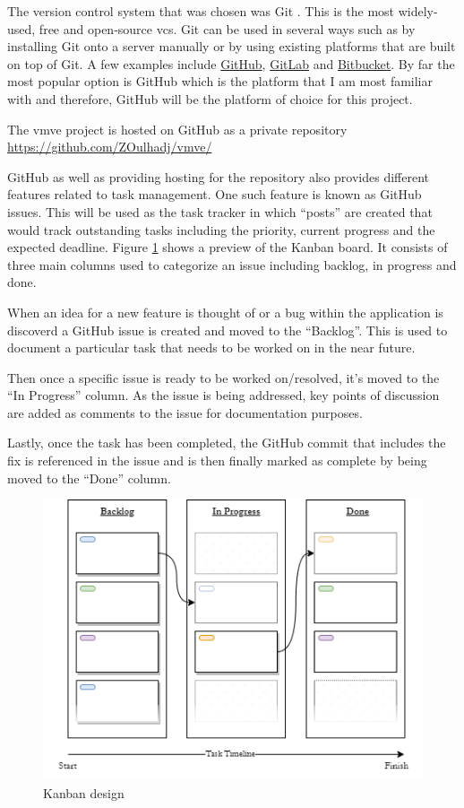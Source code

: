 \documentclass[11pt]{article}
\begin{document}
The version control system that was chosen was Git \cite{gitvcs}. This is the
most widely-used, free and open-source \gls{vcs}. Git can be used in several
ways such as by installing Git onto a server manually or by using existing
platforms that are built on top of Git. A few examples include
\href{http://github.com}{GitHub}, \href{http://gitlab.com}{GitLab} and
\href{https://bitbucket.org/}{Bitbucket}. By far the most popular option is
GitHub which is the platform that I am most familiar with and therefore, GitHub
will be the platform of choice for this project.


The \gls{vmve} project is hosted on GitHub as a private repository
\url{https://github.com/ZOulhadj/vmve/}


GitHub as well as providing hosting for the repository also provides different
features related to task management. One such feature is known as GitHub issues.
This will be used as the task tracker in which ``posts'' are created that would
track outstanding tasks including the priority, current progress and the
expected deadline. Figure \ref{fig:kanban_design} shows a preview of the Kanban
board. It consists of three main columns used to categorize an issue including
backlog, in progress and done. 

When an idea for a new feature is thought of or a bug within the application is
discoverd a GitHub issue is created and moved to the ``Backlog''. This is used
to document a particular task that needs to be worked on in the near future.

Then once a specific issue is ready to be worked on/resolved, it's moved to the
``In Progress'' column. As the issue is being addressed, key points of discussion
are added as comments to the issue for documentation purposes.

Lastly, once the task has been completed, the GitHub commit that includes the
fix is referenced in the issue and is then finally marked as complete by being
moved to the ``Done'' column.

\begin{figure}[h!]
  \centering
  \includegraphics[width=\textwidth]{images/kanban_design.png}
  \caption{Kanban design}
  \label{fig:kanban_design}
\end{figure}
\end{document}
